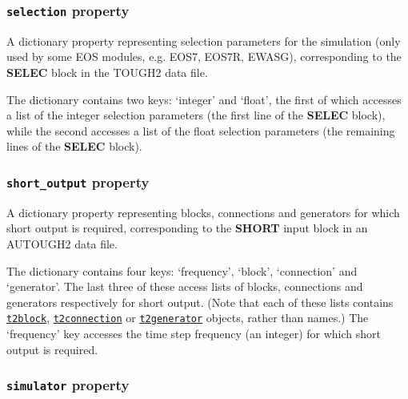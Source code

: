 \begin{snugshade}
\subsubsection{\texttt{selection} property}
\end{snugshade}
\label{sec:t2data:selection}

A dictionary property representing selection parameters for the simulation (only used by some EOS modules, e.g. EOS7, EOS7R, EWASG), corresponding to the \textbf{SELEC} block in the TOUGH2 data file.

The dictionary contains two keys: `integer' and `float', the first of which accesses a list of the integer selection parameters (the first line of the \textbf{SELEC} block), while the second accesses a list of the float selection parameters (the remaining lines of the \textbf{SELEC} block).

\begin{snugshade}
\subsubsection{\texttt{short\_output} property}
\end{snugshade}
\label{sec:t2data:short_output}

A dictionary property representing blocks, connections and generators for which short output is required, corresponding to the \textbf{SHORT} input block in an AUTOUGH2 data file.

The dictionary contains four keys: `frequency', `block', `connection' and `generator'. The last three of these access lists of blocks, connections and generators respectively for short output.  (Note that each of these lists contains \hyperref[t2blockobjects]{\texttt{t2block}}, \hyperref[t2connectionobjects]{\texttt{t2connection}} or \hyperref[t2generatorobjects]{\texttt{t2generator}} objects, rather than names.)  The `frequency' key accesses the time step frequency (an integer) for which short output is required.

\begin{snugshade}
\subsubsection{\texttt{simulator} property}
\end{snugshade}
\label{sec:t2data:simulator}

